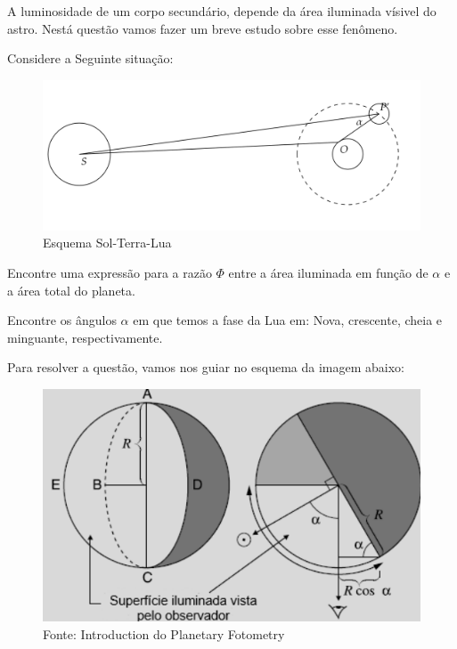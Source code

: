 \documentclass[11pt]{article}
\begin{document}
\begin{pproblem}
    A luminosidade de um corpo secundário, depende da área iluminada vísivel do astro. Nestá questão vamos fazer um breve estudo sobre esse fenômeno.
    \begin{alternativas}
        \item  Considere a Seguinte situação:
        \begin{figure}[H]
            \centering
            \includegraphics[width=0.8\linewidth]{imagens/fotometria 1.png}
            \caption{Esquema Sol-Terra-Lua}
        \end{figure}

        Encontre uma expressão para a razão \(\Phi\) entre a área iluminada em função de \(\alpha\) e a área total do planeta.
        
        \item Encontre os ângulos \(\alpha\) em que temos a fase da Lua em: Nova, crescente, cheia e minguante, respectivamente.
    \end{alternativas}

\begin{pssolution*}{}{}
    Para resolver a questão, vamos nos guiar no esquema da imagem abaixo:
    \begin{figure}[H]
       \centering
       \includegraphics[width=0.8\linewidth]{imagens/fotometriaplanetaria.png}
       \caption{Fonte: Introduction do Planetary Fotometry} 
    \end{figure}


\end{pssolution*}
\end{pproblem}
\end{document}
